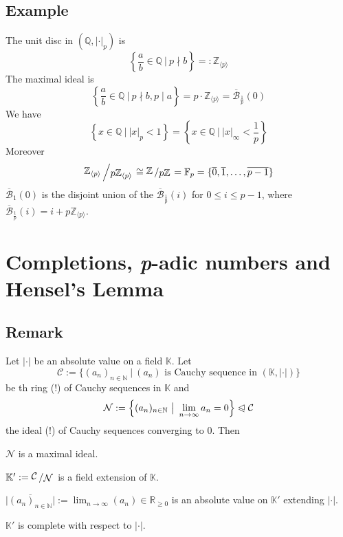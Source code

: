 \documentclass[12pt]{book}
\newcommand{\slant}[2]{{\raisebox{.1em}{$#1$}\left/\raisebox{-.1em}{$#2$}\right.}}
\begin{document}
\begin{spacing}{1.3}
\subsection{Example }%
\titleformat{\subsection}{\normalfont\normalsize\bfseries}{}{0em}{#1 \thesubsection}
The unit disc in $(\mathbb{Q}, |\cdot|_p)$ is
$$\left\{ \frac{a}{b} \in \mathbb{Q} \ \big\vert\ p\nmid b \right\} =: \mathbb{Z}_{\langle p\rangle}$$
The maximal ideal is
$$\left\{\frac{a}{b} \in \mathbb{Q} \ \big\vert\ p \nmid b, p\mid a \right\}=p\cdot \mathbb{Z}_{\langle p\rangle}=\overline{\mathcal{B}}_{\frac{1}{p}}(0)$$
We have
$$\left\{x \in \mathbb{Q} \ \big\vert\ |x|_p < 1\right\}=\left\{x \in \mathbb{Q} \ \big\vert\ |x|_{\infty} < \frac{1}{p} \right\}$$
Moreover
$$\slant{\mathbb{Z}_{\langle p\rangle}}{p \mathbb{Z}_{\langle p\rangle}} \cong \slant{\mathbb{Z}}{p\mathbb{Z}}=\mathbb{F}_p=\{\overline{0}, \overline{1}, \ldots, \overline{p-1}\}$$
$\overline{\mathcal{B}}_1(0)$ is the disjoint union of the $\overline{\mathcal{B}}_{\frac{1}{p}}(i)$ for $0\leqslant i \leqslant p-1$, where $\overline{\mathcal{B}}_{\frac{1}{p}}(i)=i+p\mathbb{Z}_{\langle p\rangle}$.


\renewcommand*\thesection{\S\ \arabic{section}\quad }
\section{Completions, \textit{p}-adic numbers and Hensel's Lemma}
\renewcommand*\thesection{\arabic{section}}

\subsection{Remark} %
Let $|\cdot|$ be an absolute value on a field $\mathbb{K}$. Let
$$\mathcal{C}:= \{(a_n)_{n \in \mathbb{N}} \ \big \vert \ (a_n) \textrm{ is Cauchy sequence in }(\mathbb{K}, |\cdot |) \}$$
be th ring (!) of Cauchy sequences in $\mathbb{K}$ and 
$$\mathcal{N}:= \left\{(a_n)_{n \in \mathbb{N}}\ \big\vert \ \lim_{n \to \infty}a_n=0\right\} \trianglelefteqslant \mathcal{C}$$
the ideal (!) of Cauchy sequences converging to $0$.
Then
\begin{compactenum}
\item $\mathcal{N}$ is a maximal ideal.
\item $\mathbb{K}':=\slant{\mathcal{C}}{\mathcal{N}}$ is a field extension of $\mathbb{K}$.
\item $\vert \overline{(a_n)_{n \in \mathbb{N}}} \vert := \lim_{n \to \infty} (a_n) \in \mathbb{R}_{\geqslant 0}$ is an absolute value on $\mathbb{K}'$ extending $|\cdot|$.
\item $\mathbb{K}'$ is complete with respect to $|\cdot|$.
\end{compactenum}


\end{spacing}
\end{document}
